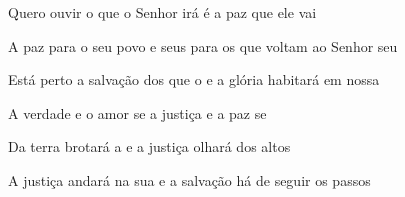 \begin{greenumerate}
  \item {}Quero ouvir o que o Senhor irá  é a paz que ele vai 

  \item {}A paz para o seu povo e seus  para os que voltam ao Senhor seu 

  \item {}Está perto a salvação dos que o  e a glória habitará em nossa 

  \item {}A verdade e o amor se  a justiça e a paz se 

  \item {}Da terra brotará a  e a justiça olhará dos altos 

  \item {}A justiça andará na sua  e a salvação há de seguir os passos 
\end{greenumerate}